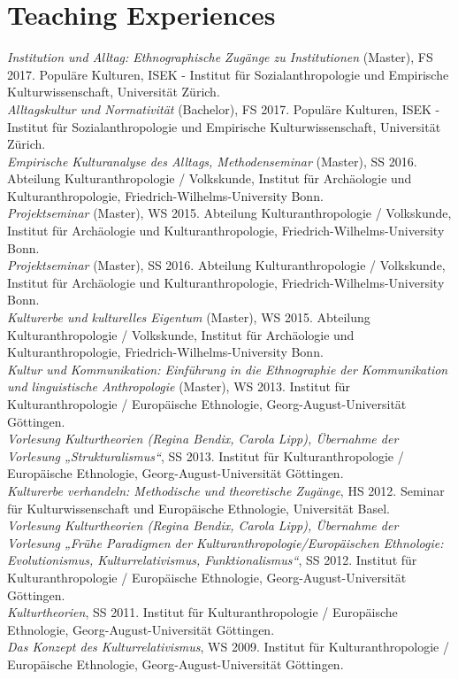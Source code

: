 \documentclass[11pt, a4paper]{article} %
\begin{document}
\section*{Teaching Experiences}
\emph{Institution und Alltag: Ethnographische Zugänge zu Institutionen} (Master), FS 2017. Populäre Kulturen, ISEK - Institut für Sozialanthropologie und Empirische Kulturwissenschaft, Universität Zürich.\\[.25cm]
\emph{Alltagskultur und Normativität} (Bachelor), FS 2017. Populäre Kulturen, ISEK - Institut für Sozialanthropologie und Empirische Kulturwissenschaft, Universität Zürich.\\[.25cm]
\emph{Empirische Kulturanalyse des Alltags, Methodenseminar} (Master), SS 2016. Abteilung Kulturanthropologie / Volkskunde, Institut für Archäologie und Kulturanthropologie, Friedrich-Wilhelms-University Bonn.\\[.25cm]
\emph{Projektseminar} (Master), WS 2015. Abteilung Kulturanthropologie / Volkskunde, Institut für Archäologie und Kulturanthropologie, Friedrich-Wilhelms-University Bonn.\\[.25cm]
\emph{Projektseminar} (Master), SS 2016. Abteilung Kulturanthropologie / Volkskunde, Institut für Archäologie und Kulturanthropologie, Friedrich-Wilhelms-University Bonn.\\[.25cm]
\emph{Kulturerbe und kulturelles Eigentum} (Master), WS 2015. Abteilung Kulturanthropologie / Volkskunde, Institut für Archäologie und Kulturanthropologie, Friedrich-Wilhelms-University Bonn.\\[.25cm]
\emph{Kultur und Kommunikation: Einführung in die Ethnographie der Kommunikation und linguistische Anthropologie} (Master), WS 2013. Institut für Kulturanthropologie / Europäische Ethnologie, Georg-August-Universität Göttingen.\\[.25cm]
\emph{Vorlesung Kulturtheorien (Regina Bendix, Carola Lipp), Übernahme der Vorlesung „Strukturalismus“}, SS 2013. Institut für Kulturanthropologie / Europäische Ethnologie, Georg-August-Universität Göttingen.\\[.25cm]
\emph{Kulturerbe verhandeln: Methodische und theoretische Zugänge}, HS 2012. Seminar für Kulturwissenschaft und Europäische Ethnologie, Universität Basel.\\[.25cm]
\emph{Vorlesung Kulturtheorien (Regina Bendix, Carola Lipp), Übernahme der Vorlesung „Frühe Paradigmen der Kulturanthropologie/Europäischen Ethnologie: Evolutionismus, Kulturrelativismus, Funktionalismus“}, SS 2012. Institut für Kulturanthropologie / Europäische Ethnologie, Georg-August-Universität Göttingen.\\[.25cm]
\emph{Kulturtheorien}, SS 2011. Institut für Kulturanthropologie / Europäische Ethnologie, Georg-August-Universität Göttingen.\\[.25cm]
\emph{Das Konzept des Kulturrelativismus}, WS 2009. Institut für Kulturanthropologie / Europäische Ethnologie, Georg-August-Universität Göttingen. 
\end{document}
